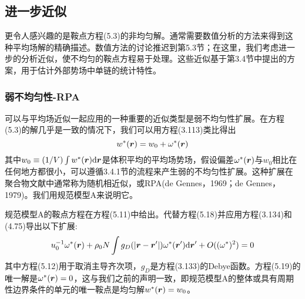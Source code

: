 \subsection{进一步近似}
更令人感兴趣的是鞍点方程(5.3)的非均匀解。通常需要数值分析的方法来得到这种平均场解的精确描述。数值方法的讨论推迟到第5.3节；在这里，我们考虑进一步的分析近似，使不均匀的鞍点方程易于处理。这些近似基于第3.4节中提出的方案，用于估计外部势场中单链的统计特性。
\subsubsection{弱不均匀性-RPA}
可以与平均场近似一起应用的一种重要的近似类型是弱不均匀性扩展。在方程(5.3)的解几乎是一致的情况下，我们可以用方程(3.113)类比得出
\begin{equation}
w^*(\bm{r})=w_0+\omega^*(\bm{r})
\end{equation}
其中$w_0\equiv(1/V)\int w^*(\bm{r})\mathrm{d}\bm{r}$是体积平均的平均场势场，假设偏差$\omega^*(\bm{r})$与$w_0$相比在任何地方都很小，可以遵循3.4.1节的流程来产生弱的不均匀性扩展。这种扩展在聚合物文献中通常称为随机相近似，或RPA(de Gennes，1969；de Gennes，1979)。我们用规范模型A来说明它。

规范模型A的鞍点方程在方程(5.11)中给出。代替方程(5.18)并应用方程(3.134)和(4.75)导出以下扩展:
\begin{equation}
u_0^{-1}\omega^*(\bm{r})+\rho_0N\int g_D(\left|\bm{r}-\bm{r}'\right|)\omega^*(\bm{r}')\mathrm{d}\bm{r}'+O((\omega^*)^2)=0
\end{equation}
其中方程(5.12)用于取消主导齐次项，$g_D$是方程(3.133)的Debye函数。方程(5.19)的唯一解是$\omega^*(\bm{r})=0$，这与我们之前的声明一致，即规范模型A的整体或具有周期性边界条件的单元的唯一鞍点是均匀解$w^*(\bm{r})=w_0$。


